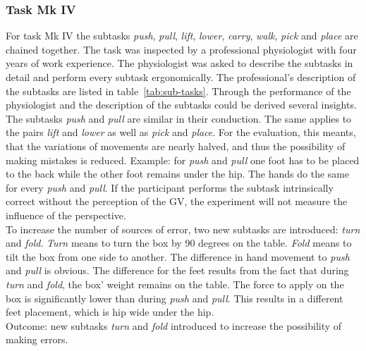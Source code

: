 \subsubsection{Task Mk IV}
For task Mk IV the subtasks \textit{push}, \textit{pull}, \textit{lift}, \textit{lower}, \textit{carry}, \textit{walk}, \textit{pick} and \textit{place} are chained together. The task was inspected by a professional physiologist with four years of work experience. The physiologist was asked to describe the subtasks in detail and perform every subtask ergonomically. The professional's description of the subtasks are listed in table~\ref{tab:sub-tasks}. Through the performance of the physiologist and the description of the subtasks could be derived several insights. The subtasks \textit{push} and \textit{pull} are similar in their conduction. The same applies to the pairs \textit{lift} and \textit{lower} as well as \textit{pick} and \textit{place}. For the evaluation, this meants, that the variations of movements are nearly halved, and thus the possibility of making mistakes is reduced. Example: for \textit{push} and \textit{pull} one foot has to be placed to the back while the other foot remains under the hip. The hands do the same for every \textit{push} and \textit{pull}. If the participant performs the subtask intrinsically correct without the perception of the GV, the experiment will not measure the influence of the perspective.\\
To increase the number of sources of error, two new subtasks are introduced: \textit{turn} and \textit{fold}. \textit{Turn} means to turn the box by 90 degrees on the table. \textit{Fold} means to tilt the box from one side to another. The difference in hand movement to \textit{push} and \textit{pull} is obvious. The difference for the feet results from the fact that during \textit{turn} and \textit{fold}, the box' weight remains on the table. The force to apply on the box is significantly lower than during \textit{push} and \textit{pull}. This results in a different feet placement, which is hip wide under the hip.\\
Outcome: new subtasks \textit{turn} and \textit{fold} introduced to increase the possibility of making errors.

